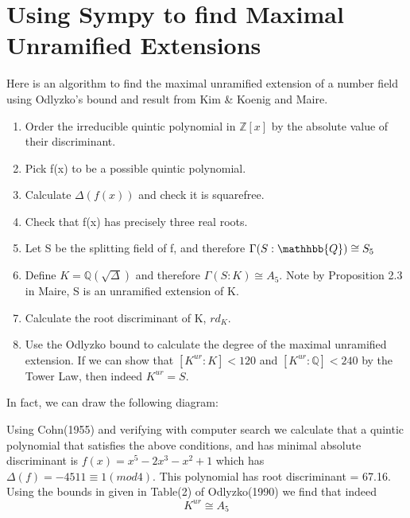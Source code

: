 \documentclass[preprint,12pt,leqno]{elsarticle}
\begin{document}
\section{Using Sympy to find Maximal Unramified Extensions}
Here is an algorithm to find the maximal unramified extension of a number field using Odlyzko's bound and result from Kim \& Koenig and Maire.
\begin{enumerate}
  \item  Order the irreducible quintic polynomial in $\mathbb{Z}[x]$ by the absolute value of their discriminant. 
  \item Pick f(x) to be a possible quintic polynomial.
  \item Calculate $\Delta(f(x))$ and check it is squarefree.
  \item Check that f(x) has precisely three real roots. 
  \item Let S be the splitting field of f, and therefore $\Gamma(S:\mathhbb{Q})\cong S_5$
  \item Define $K=\mathbb{Q}(\sqrt{\Delta})$ and therefore $\Gamma(S:K)\cong A_5$. Note by Proposition 2.3 in Maire, S is an unramified extension of K. 
  \item Calculate the root discriminant of K, $rd_K$.
  \item Use the Odlyzko bound to calculate the degree of the maximal unramified extension. If we can show that $[K^{ur}:K]<120$ and $[K^{ur}:\mathbb{Q}]<240$ by the Tower Law, then indeed $K^{ur} = S$.
\end{enumerate}
\newline
In fact, we can draw the following diagram: 
\newline
\begin{center}
\end{center}
\newline
Using Cohn(1955) and verifying with computer search we calculate that a quintic polynomial that satisfies the above conditions, and has minimal absolute discriminant is $f(x) = x^5-2x^3-x^2+1$ which has $\Delta(f) = -4511\equiv1 (mod 4)$.
This polynomial has root discriminant = 67.16.
Using the bounds in given in Table(2) of Odlyzko(1990) we find that indeed
\begin{equation}
    K^{ur}\cong A_{5}
\end{equation}
\end{document}
